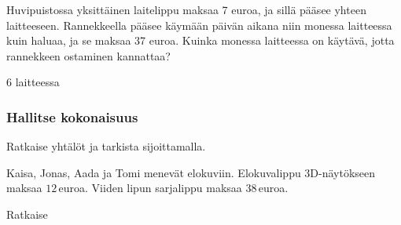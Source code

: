 \begin{tehtavasivu}
\begin{tehtava}
Huvipuistossa yksittäinen laitelippu maksaa 7 euroa, ja sillä pääsee yhteen laitteeseen. Rannekkeella pääsee käymään päivän aikana niin monessa laitteessa kuin haluaa, ja se maksaa 37 euroa. Kuinka monessa laitteessa on käytävä, jotta rannekkeen ostaminen kannattaa?
\begin{vastaus}
$6$ laitteessa
\end{vastaus}
\end{tehtava}

\subsubsection*{Hallitse kokonaisuus}


\begin{tehtava}
Ratkaise yhtälöt ja tarkista sijoittamalla.
%
\begin{vastaus}
\end{vastaus}
\end{tehtava}


\begin{tehtava}
Kaisa, Jonas, Aada ja Tomi menevät elokuviin. Elokuvalippu 3D-näytökseen maksaa $12$\,euroa. Viiden lipun sarjalippu maksaa $38$\,euroa.

\begin{vastaus}
\end{vastaus}
\end{tehtava}

\begin{tehtava}
Ratkaise

\begin{vastaus}
\end{vastaus}
\end{tehtava}



\end{tehtavasivu}
